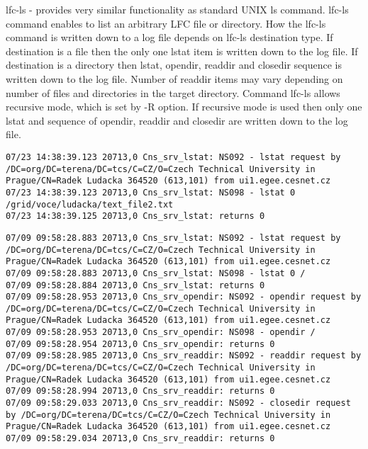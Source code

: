 \documentclass[a4paper, 11pt]{article} %
\begin{document}
lfc-ls - provides very similar functionality as standard UNIX ls command. lfc-ls command enables to list an arbitrary LFC file or directory. How the lfc-ls command is written down to a log file depends on lfc-ls destination type. If destination is a file then the only one lstat item is written down to the log file. If destination is a directory then lstat, opendir, readdir and closedir sequence is written down to the log file. Number of readdir items may vary depending on number of files and directories in the target directory. Command lfc-ls allows recursive mode, which is set by -R option. If recursive mode is used then only one lstat and sequence of opendir, readdir and closedir are written down to the log file.

\begin{lstlisting}[label={log:lfcls1},caption={lfc-ls /grid/voce/ludacka/text\_file2.txt}]
07/23 14:38:39.123 20713,0 Cns_srv_lstat: NS092 - lstat request by /DC=org/DC=terena/DC=tcs/C=CZ/O=Czech Technical University in Prague/CN=Radek Ludacka 364520 (613,101) from ui1.egee.cesnet.cz
07/23 14:38:39.123 20713,0 Cns_srv_lstat: NS098 - lstat 0 /grid/voce/ludacka/text_file2.txt
07/23 14:38:39.125 20713,0 Cns_srv_lstat: returns 0
\end{lstlisting}

\begin{lstlisting}[label={log:lfcls2},caption={lfc-ls /grid/voce/ludacka/text\_file2.txt}]
07/09 09:58:28.883 20713,0 Cns_srv_lstat: NS092 - lstat request by /DC=org/DC=terena/DC=tcs/C=CZ/O=Czech Technical University in Prague/CN=Radek Ludacka 364520 (613,101) from ui1.egee.cesnet.cz
07/09 09:58:28.883 20713,0 Cns_srv_lstat: NS098 - lstat 0 /
07/09 09:58:28.884 20713,0 Cns_srv_lstat: returns 0
07/09 09:58:28.953 20713,0 Cns_srv_opendir: NS092 - opendir request by /DC=org/DC=terena/DC=tcs/C=CZ/O=Czech Technical University in Prague/CN=Radek Ludacka 364520 (613,101) from ui1.egee.cesnet.cz
07/09 09:58:28.953 20713,0 Cns_srv_opendir: NS098 - opendir / 
07/09 09:58:28.954 20713,0 Cns_srv_opendir: returns 0
07/09 09:58:28.985 20713,0 Cns_srv_readdir: NS092 - readdir request by /DC=org/DC=terena/DC=tcs/C=CZ/O=Czech Technical University in Prague/CN=Radek Ludacka 364520 (613,101) from ui1.egee.cesnet.cz
07/09 09:58:28.994 20713,0 Cns_srv_readdir: returns 0
07/09 09:58:29.033 20713,0 Cns_srv_readdir: NS092 - closedir request by /DC=org/DC=terena/DC=tcs/C=CZ/O=Czech Technical University in Prague/CN=Radek Ludacka 364520 (613,101) from ui1.egee.cesnet.cz
07/09 09:58:29.034 20713,0 Cns_srv_readdir: returns 0
\end{lstlisting}
\end{document}
